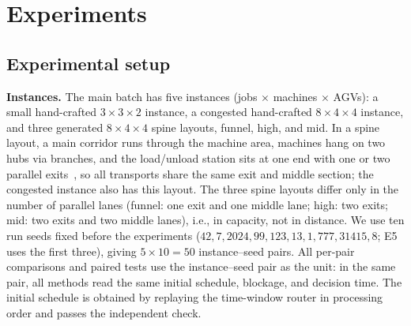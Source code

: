 \documentclass[manuscript,screen,review]{acmart}
\newcommand{\NInst}{5}
\newcommand{\NSeeds}{10}
\newcommand{\NPairs}{50}
\begin{document}
\section{Experiments}
\label{sec:experiments}

\subsection{Experimental setup}
\label{sec:protocol}

\textbf{Instances.}
The main batch has five instances (jobs \(\times\) machines \(\times\) AGVs): a small hand-crafted \(3\times3\times2\) instance, a congested hand-crafted \(8\times4\times4\) instance, and three generated \(8\times4\times4\) spine layouts, funnel, high, and mid.
In a spine layout, a main corridor runs through the machine area, machines hang on two hubs via branches, and the load/unload station sits at one end with one or two parallel exits~\cite{suh2022spine}, so all transports share the same exit and middle section; the congested instance also has this layout.
The three spine layouts differ only in the number of parallel lanes (funnel: one exit and one middle lane; high: two exits; mid: two exits and two middle lanes), i.e., in capacity, not in distance.
We use ten run seeds fixed before the experiments (\(42,7,2024,99,123,13,1,777,31415,8\); E5 uses the first three), giving \(\NInst\times\NSeeds=\NPairs\) instance--seed pairs.
All per-pair comparisons and paired tests use the instance--seed pair as the unit: in the same pair, all methods read the same initial schedule, blockage, and decision time.
The initial schedule is obtained by replaying the time-window router in processing order and passes the independent check.
\end{document}
